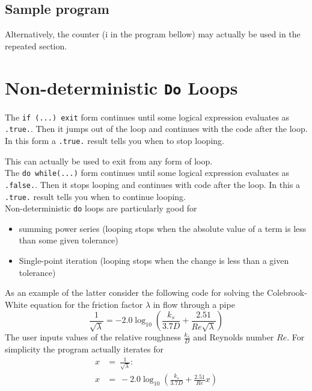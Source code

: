 \documentclass[12pt,oneside]{book}
\newcommand{\code}[1]{\lstinline[keywordstyle=\color{black},basicstyle=\ttfamily]{#1}}
\begin{document}
    \subsection{Sample program}
    
    Alternatively, the counter (i in the program bellow) may actually be used in the repeated section.
    
    \section{Non-deterministic \code{Do} Loops}
    The \code{if (...) exit} form continues until some logical expression evaluates as \code{.true.}. Then it jumps out of the loop and continues with the code after the loop. In this form a \code{.true.} result tells you when to stop looping.

    This can actually be used to exit from any form of loop.\\

    The \code{do while(...)} form continues until some logical expression evaluates as \code{.false.}. Then it stops looping and continues with code after the loop. In this a \code{.true.} result tells you when to continue looping.\\

    Non-deterministic \code{do} loops are particularly good for
    \begin{itemize}
        \item summing power series (looping stops when the absolute value of a term is less than some given tolerance)
        \item Single-point iteration (looping stops when the change is less than a given tolerance)
    \end{itemize}
    As an example of the latter consider the following code for solving the Colebrook-White equation for the friction factor $ \lambda $ in flow through a pipe
    \[\frac{1}{\sqrt{\lambda}}=-2.0\log_{10} \left(\frac{k_s}{3.7D}+\frac{2.51}{Re\sqrt{\lambda}}\right)\]
    The user inputs values of the relative roughness $ \frac{k_s}{D} $ and Reynolds number $ Re $. For simplicity the program actually iterates for
    \begin{align*}
        x &=\ \frac{1}{\sqrt{\lambda}} :\\
        x &=\ -2.0\log_{10} \left(\frac{k_s}{3.7D}+\frac{2.51}{Re}x\right)
    \end{align*}
    
\end{document}
